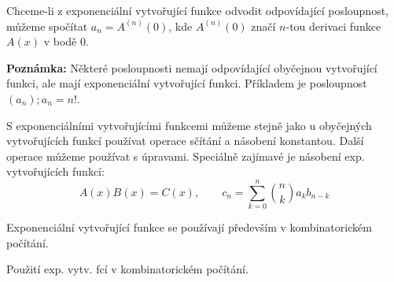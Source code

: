 Chceme-li z exponenciální vytvořující funkce odvodit odpovídající posloupnost, můžeme spočítat $a_n = A^{(n)}(0)$, kde $A^{(n)}(0)$ značí $n$-tou derivaci funkce $A(x)$ v bodě 0.

{\bf Poznámka:} Některé posloupnosti nemají odpovídající obyčejnou vytvořující funkci, ale mají exponenciální vytvořující funkci. Příkladem je posloupnost $(a_n); a_n = n!$.

S exponenciálními vytvořujícími funkcemi můžeme stejně jako u obyčejných vytvořujících funkcí používat operace sčítání a násobení konstantou. Další operace můžeme používat s úpravami. Speciálně zajímavé je násobení exp. vytvořujících funkcí:
$$A(x)B(x) = C(x),\qquad c_n = \sum_{k=0}^n{n\choose k}a_kb_{n-k}$$

Exponenciální vytvořující funkce se používají především v kombinatorickém počítání.

\todo Použití exp. vytv. fcí v kombinatorickém počítání.

